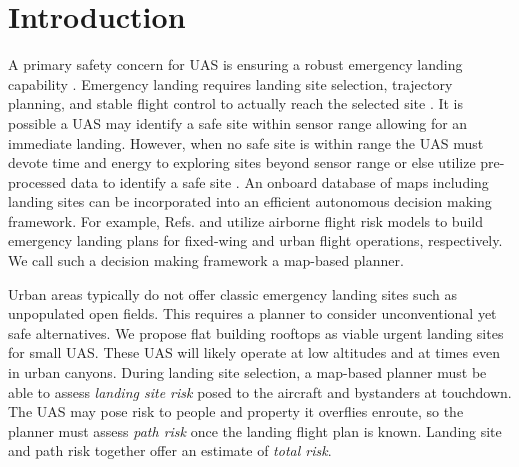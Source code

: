 \section{Introduction}

A primary safety concern for \ac{UAS} is ensuring a robust emergency landing capability \cite{winnefeld_unmanned_2011, degarmo_issues_2013}.  Emergency landing requires landing site selection, trajectory planning, and stable flight control to actually reach the selected site \cite{atkins_emergency_2006}. It is possible a \ac{UAS} may identify a safe site within sensor range allowing for an immediate landing.  However, when no safe site is within range the \ac{UAS} must devote time and energy to exploring sites beyond sensor range or else utilize pre-processed data to identify a safe site \cite{ten_harmsel_emergency_2017, ochoa_fail-safe_2017}.  An onboard database of maps including landing sites can be incorporated into an efficient autonomous decision making framework.  For example, Refs.  \cite{atkins_emergency_2006, meuleau_emergency_2009}  and \cite{sankararaman_towards_2017} utilize airborne flight risk models to build emergency landing plans for fixed-wing and urban flight operations, respectively. We call such a decision making framework a map-based planner.

Urban areas typically do not offer classic emergency landing sites such as unpopulated open fields. This requires a planner to consider unconventional yet safe alternatives. We propose flat building rooftops as viable urgent landing sites for small UAS.  These \ac{UAS} will likely operate at low altitudes and at times even in urban canyons. During landing site selection, a map-based planner must be able to assess \emph{landing site risk} posed to the aircraft and bystanders at touchdown. The \ac{UAS} may pose risk to people and property it overflies enroute, so the planner must assess \emph{path risk} once the landing flight plan is known.  Landing site and path risk together offer an estimate of \emph{total risk}.

